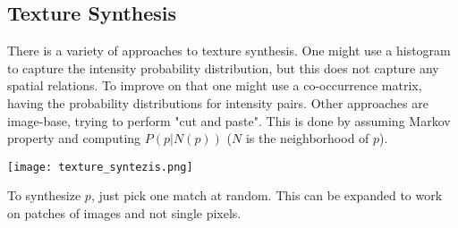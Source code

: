 \subsection{Texture Synthesis}

There is a variety of approaches to texture synthesis. One might use a histogram to capture the intensity probability distribution, but this does not capture any spatial relations. To improve on that one might use a co-occurrence matrix, having the probability distributions for intensity pairs. Other approaches are image-base, trying to perform "cut and paste". This is done by assuming Markov property and computing $P(p | N(p))$ ($N$ is the neighborhood of $p$).
\begin{center}
	\texttt{[image: texture\_syntezis.png]}
\end{center}

To synthesize $p$, just pick one match at random. This can be expanded to work on patches of images and not single pixels.
